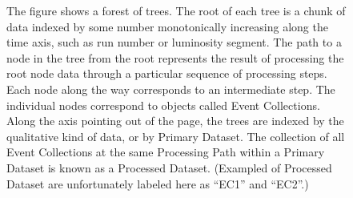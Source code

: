 \begin{figure}[hbtp]
  \begin{center}
    \caption{The figure shows a forest of trees.  The root of each tree is a 
chunk of data indexed by some number monotonically increasing along the time axis, 
such as run number or luminosity segment.
The path to a node in the tree from the root represents the result of processing 
the root node data through a particular sequence of processing steps.  Each node 
along the way corresponds to an intermediate step.  The individual nodes correspond to objects 
called Event Collections.  Along the axis pointing out of the page, the trees are 
indexed by the qualitative kind of data, or by Primary Dataset. The collection of all 
Event Collections at the same Processing Path within a Primary Dataset is known as a
Processed Dataset. (Exampled of Processed Dataset are unfortunately labeled here 
as ``EC1'' and ``EC2''.)}
    \label{fig:forest}
  \end{center}
\end{figure}



